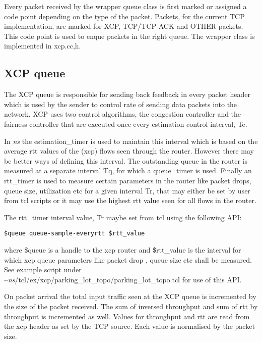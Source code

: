    Every packet received by the wrapper queue class is first marked or
    assigned a code point depending on the type of the packet. Packets,
    for the current TCP implementation, are marked for XCP, TCP/TCP-ACK
    and OTHER packets. This code point is used to enque packets in the right
    queue. The wrapper class is implemented in xcp.{cc,h}.
    
    
    \subsection{XCP queue}
    \label{sec:xcp_queue}

    The XCP queue is responsible for sending back feedback in every packet
    header which is used by the sender to control rate of sending data
    packets into the network. XCP uses two control algorithms, the
    congestion controller and the fairness controller that are executed
    once every estimation control interval, Te. 

    In \emph{ns}{}  the
    estimation\_timer is used to maintain this interval which is based on
    the average rtt values of the (xcp) flows seen through the router. However
    there may be better ways of defining this interval. The outstanding
    queue in the router is measured at a separate interval Tq, for which a
    queue\_timer is used. Finally an rtt\_timer is used to measure certain
    parameters in the router like packet drops, queue size, utilization 
    etc for a given interval Tr, that may either be set by user from tcl
    scripts or it may use the highest rtt value seen for all flows in the
    router. 

    The rtt\_timer interval value, Tr maybe set from tcl using the
    following API: 
    
    {\tt  \$queue queue-sample-everyrtt \$rtt\_value}
    
    where \$queue is a handle to the xcp router and \$rtt\_value is the
    interval for which xcp queue parameters like packet drop , queue size etc
    shall be measured. See example script under
    \textasciitilde\emph{ns}/{tcl/ex/xcp/parking\_lot\_topo/parking\_lot\_topo.tcl} for use of
    this API.
    
    On packet arrival the total input traffic seen at the XCP queue is
    incremented by the size of the packet received. The sum of inversed
    throughput and sum of rtt by throughput is incremented as
    well. Values for throughput and rtt are read from the xcp header as
    set by the TCP source. Each value is normalised by the packet size.
    
